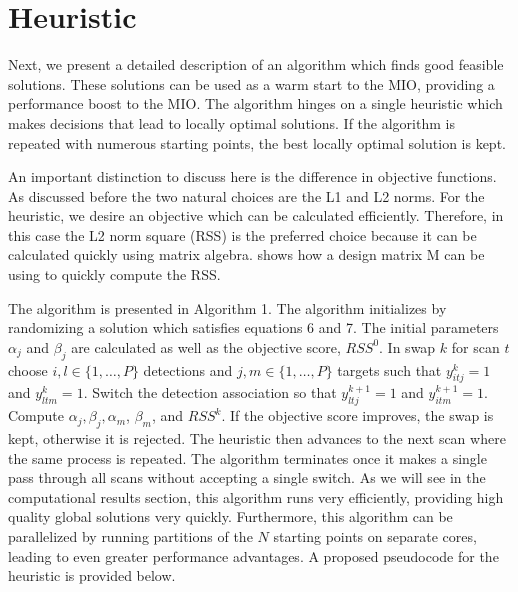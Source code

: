 \documentclass[journal]{IEEEtran}
\begin{document}
\section{Heuristic}
Next, we present a detailed description of an algorithm which finds good feasible solutions. These solutions can be used as a warm start to the MIO, providing a performance boost to the MIO. The algorithm hinges on a single heuristic which makes decisions that lead to locally optimal solutions. If the algorithm is repeated with numerous starting points, the best locally optimal solution is kept. 

An important distinction to discuss here is the difference in objective functions. As discussed before the two natural choices are the L1 and L2 norms. For the heuristic, we desire an objective which can be calculated efficiently. Therefore, in this case the L2 norm square (RSS) is the preferred choice because it can be calculated quickly using matrix algebra. \cite{RSS-Matrix} shows how a design matrix M can be using to quickly compute the RSS. 

The algorithm is presented in Algorithm 1. The algorithm initializes by randomizing a solution which satisfies equations 6 and 7. The initial  parameters $\alpha_{j}$ and $\beta_{j}$ are calculated as well as the objective score, $RSS^{0}$. In swap $k$ for scan $t$ choose $i,l\in \{1,\ldots,P\}$ detections and $j,m\in\{1,\ldots,P\}$ targets such that $y^k_{itj}=1$ and $y^k_{ltm}=1$. Switch the detection association so that $y^{k+1}_{ltj}=1$ and $y^{k+1}_{itm}=1$. Compute $\alpha_{j}, \beta_{j}, \alpha_{m}$, $\beta_{m}$, and $RSS^{k}$. If the objective score improves, the swap is kept, otherwise it is rejected. The heuristic then advances to the next scan where the same process is repeated. The algorithm terminates once it makes a single pass through all scans without accepting a single switch. As we will see in the computational results section, this algorithm runs very efficiently, providing high quality global solutions very quickly. Furthermore, this algorithm can be parallelized by running partitions of the $N$ starting points on separate cores, leading to even greater performance advantages. A proposed pseudocode for the heuristic is provided below. 
\end{document}
